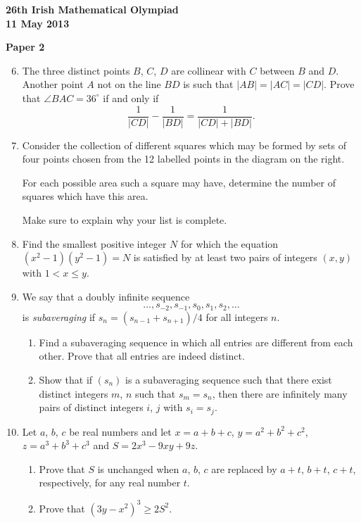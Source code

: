 \documentclass[12pt]{article}
\begin{document}
\newpage
\begin{center}
{\large\bfseries 26th Irish Mathematical Olympiad\\11 May 2013}
\end{center}
\bigskip\noindent\textbf{Paper 2}\bigskip
\begin{enumerate}
\setcounter{enumi}{5}
\item The three distinct points $B$, $C$, $D$ are collinear with $C$ between $B$ and $D$. Another point $A$ not on the line $BD$ is such that $|AB| = |AC| = |CD|$. Prove that $\angle BAC = 36^\circ$ if and only if
\[
\frac{1}{|CD|} - \frac{1}{|BD|} = \frac{1}{|CD| + |BD|}.
\]

\item Consider the collection of different squares which may be formed by sets of four points chosen from the 12 labelled points in the diagram on the right.

For each possible area such a square may have, determine the number of squares which have this area.

Make sure to explain why your list is complete.

\item Find the smallest positive integer $N$ for which the equation $(x^2-1)(y^2-1) = N$ is satisfied by at least two pairs of integers $(x,y)$ with $1 < x \leq y$.

\item We say that a doubly infinite sequence
\[
\ldots, s_{-2}, s_{-1}, s_0, s_1, s_2, \ldots
\]
is \emph{subaveraging} if $s_n = (s_{n-1} + s_{n+1})/4$ for all integers $n$.
\begin{enumerate}
\item[(a)] Find a subaveraging sequence in which all entries are different from each other. Prove that all entries are indeed distinct.
\item[(b)] Show that if $(s_n)$ is a subaveraging sequence such that there exist distinct integers $m$, $n$ such that $s_m = s_n$, then there are infinitely many pairs of distinct integers $i$, $j$ with $s_i = s_j$.
\end{enumerate}

\item Let $a$, $b$, $c$ be real numbers and let $x = a+b+c$, $y = a^2+b^2+c^2$, $z = a^3+b^3+c^3$ and $S = 2x^3 - 9xy + 9z$.
\begin{enumerate}
\item[(a)] Prove that $S$ is unchanged when $a$, $b$, $c$ are replaced by $a+t$, $b+t$, $c+t$, respectively, for any real number $t$.
\item[(b)] Prove that $(3y - x^2)^3 \geq 2S^2$.
\end{enumerate}
\end{enumerate}
\end{document}
